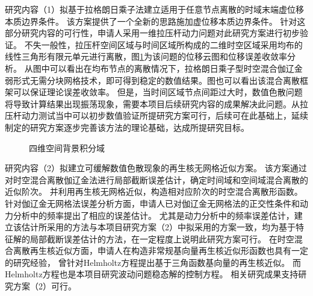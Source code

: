 研究内容（1）拟基于拉格朗日乘子法建立适用于任意节点离散的时域末端虚位移本质边界条件。
该方案提供了一个全新的思路施加虚位移本质边界条件。
针对这部分研究内容的可行性，申请人采用一维拉压杆动力问题对此研究方案进行初步验证。
不失一般性，拉压杆空间区域与时间区域所构成的二维时空区域采用均布的线性三角形有限元单元进行离散，图\ref{fg:bar}为该问题的位移云图和位移误差收敛率分析。
从图中可以看出在均布节点的离散情况下，拉格朗日乘子型时空混合伽辽金弱形式无需分块网格技术，即可得到稳定的数值结果。图也可以看出该混合离散框架可以保证理论误差收敛率。
但是，当时间区域节点间距过大时，数值色散问题将导致计算结果出现振荡现象，需要本项目后续研究内容的成果解决此问题。从拉压杆动力测试当中可以初步数值验证所提研究方案可行，后续可在此基础上，延续制定的研究方案逐步完善该方法的理论基础，达成所提研究目标。

\begin{figure}[!h]
    \centering 
    \hspace{24pt}
    \caption{四维空间背景积分域}
    \label{fg:bar}
\end{figure}

研究内容（2）拟建立可缓解数值色散现象的再生核无网格近似方案。
该方案通过对时空混合离散伽辽金法进行局部截断误差估计，确定时间域和空间域混合离散的近似阶次。
并利用再生核无网格近似，构造相对应阶次的时空混合离散形函数。
针对伽辽金无网格法误差分析方面，申请人已对伽辽金无网格法的正交性条件\cite{wu2021}和动力分析中的频率\cite{wu2018a}提出了相应的误差估计。
尤其是动力分析中的频率误差估计，建立该估计所采用的方法与本项目研究方案（2）中拟采用的方案一致，均为基于特征解的局部截断误差估计的方法，在一定程度上说明此研究方案可行。
在时空混合离散再生核近似方面，申请人在构造非常规基向量再生核近似形函数也具有一定的研究经验，
曾针对Helmholtz方程提出基于三角函数基向量的再生核近似\cite{wang2020b}。
而Helmholtz方程也是本项目研究波动问题稳态解的控制方程。
相关研究成果支持研究方案（2）可行。

